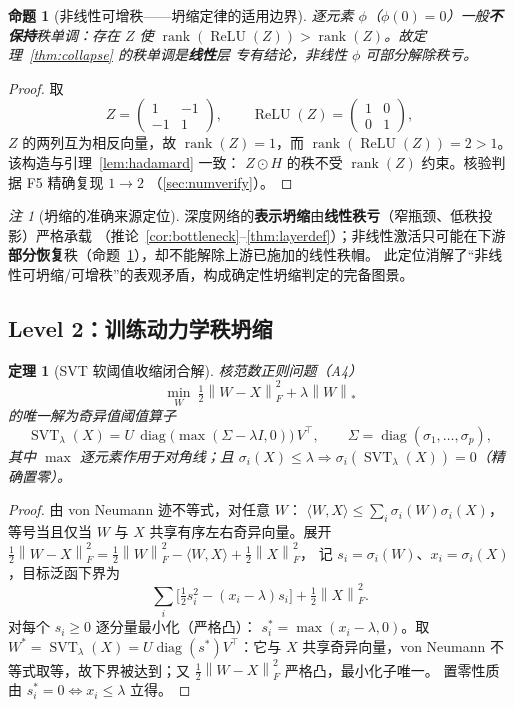 \documentclass[UTF8,11pt,a4paper]{ctexart}
\theoremstyle{plain}
\newtheorem{theorem}{定理}
\newtheorem{proposition}{命题}
\theoremstyle{definition}
\theoremstyle{remark}
\newtheorem{remark}{注}
\newcommand{\rank}{\operatorname{rank}}
\newcommand{\diag}{\operatorname{diag}}
\newcommand{\ReLU}{\operatorname{ReLU}}
\newcommand{\SVT}{\operatorname{SVT}}
\newcommand{\Fnorm}[1]{\left\lVert #1\right\rVert_F}
\newcommand{\Nnorm}[1]{\left\lVert #1\right\rVert_{*}}
\newcommand{\half}{\tfrac12}
\begin{document}
\begin{proposition}[非线性可增秩——坍缩定律的适用边界]\label{prop:relu}
逐元素 $\phi$（$\phi(0)=0$）一般\textbf{不保持}秩单调：存在 $Z$ 使
$\rank(\ReLU(Z))>\rank(Z)$。故定理~\ref{thm:collapse} 的秩单调是\textbf{线性}层
专有结论，非线性 $\phi$ 可部分解除秩亏。
\end{proposition}
\begin{proof}
取
\[
Z=\begin{pmatrix}1&-1\\-1&1\end{pmatrix},\qquad
\ReLU(Z)=\begin{pmatrix}1&0\\0&1\end{pmatrix},
\]
$Z$ 的两列互为相反向量，故 $\rank(Z)=1$，而 $\rank(\ReLU(Z))=2>1$。该构造与引理~\ref{lem:hadamard} 一致：
$Z\odot H$ 的秩不受 $\rank(Z)$ 约束。核验判据 F5 精确复现 $1\to2$
（\textsection\ref{sec:numverify}）。
\end{proof}

\begin{remark}[坍缩的准确来源定位]\label{rem:locate}
深度网络的\textbf{表示坍缩}由\textbf{线性秩亏}（窄瓶颈、低秩投影）严格承载
（推论~\ref{cor:bottleneck}--\ref{thm:layerdef}）；非线性激活只可能在下游
\textbf{部分恢复}秩（命题~\ref{prop:relu}），却不能解除上游已施加的线性秩帽。
此定位消解了“非线性可坍缩/可增秩”的表观矛盾，构成确定性坍缩判定的完备图景。
\end{remark}

\subsection{Level 2：训练动力学秩坍缩}\label{sec:main:l2}

\begin{theorem}[SVT 软阈值收缩闭合解]\label{thm:svt}
核范数正则问题（A4）
\[
\min_{W}\ \half\Fnorm{W-X}^2+\lambda\Nnorm{W}
\]
的唯一解为奇异值阈值算子\cite{cai2010}
\[
\SVT_\lambda(X)=U\,\diag\!\big(\max(\Sigma-\lambda I,0)\big)\,V^\top,
\qquad \Sigma=\diag(\sigma_1,\dots,\sigma_p),
\]
其中 $\max$ 逐元素作用于对角线；且
$\sigma_i(X)\le\lambda\Rightarrow\sigma_i(\SVT_\lambda(X))=0$（精确置零）。
\end{theorem}
\begin{proof}
由 von Neumann 迹不等式，对任意 $W$：
$\langle W,X\rangle\le\sum_i\sigma_i(W)\sigma_i(X)$，等号当且仅当 $W$ 与 $X$
共享有序左右奇异向量。展开
$\half\Fnorm{W-X}^2=\half\Fnorm{W}^2-\langle W,X\rangle+\half\Fnorm{X}^2$，
记 $s_i=\sigma_i(W)$、$x_i=\sigma_i(X)$，目标泛函下界为
\[
\sum_i\Big[\half s_i^2-(x_i-\lambda)s_i\Big]+\half\Fnorm{X}^2 .
\]
对每个 $s_i\ge0$ 逐分量最小化（严格凸）：
$s_i^*=\max(x_i-\lambda,0)$。取
$W^*=\SVT_\lambda(X)=U\diag(s^*)V^\top$：它与 $X$ 共享奇异向量，von Neumann
不等式取等，故下界被达到；又 $\half\Fnorm{W-X}^2$ 严格凸，最小化子唯一。
置零性质由 $s_i^*=0\iff x_i\le\lambda$ 立得。
\end{proof}
\end{document}
